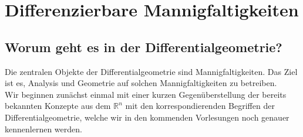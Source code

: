 \chapter{Differenzierbare Mannigfaltigkeiten}
\section*{Worum geht es in der Differentialgeometrie?}
Die zentralen Objekte der Differentialgeometrie sind Mannigfaltigkeiten. Das Ziel ist es, Analysis und Geometrie auf solchen Mannigfaltigkeiten zu betreiben. \\
Wir beginnen zunächst einmal mit einer kurzen Gegenüberstellung der bereits bekannten Konzepte aus dem $\mathbb{R}^n$ mit den korrespondierenden Begriffen der Differentialgeometrie, welche wir in den kommenden Vorlesungen noch genauer kennenlernen werden. 
